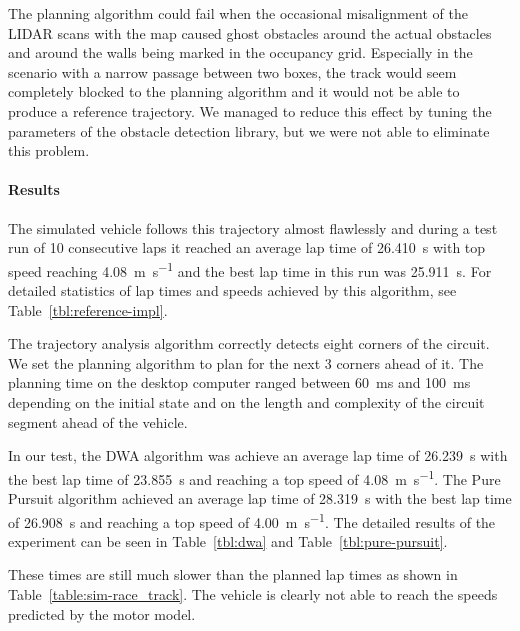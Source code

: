 The planning algorithm could fail when the occasional misalignment of the \gls*{LIDAR} scans with the map caused ghost obstacles around the actual obstacles and around the walls being marked in the occupancy grid. Especially in the scenario with a narrow passage between two boxes, the track would seem completely blocked to the planning algorithm and it would not be able to produce a reference trajectory. We managed to reduce this effect by tuning the parameters of the obstacle detection library, but we were not able to eliminate this problem.

\paragraph{Results}

The simulated vehicle follows this trajectory almost flawlessly and during a test run of 10 consecutive laps it reached an average lap time of \SI{26.410}{\second} with top speed reaching \SI{4.08}{\meter\per\second} and the best lap time in this run was \SI{25.911}{\second}. For detailed statistics of lap times and speeds achieved by this algorithm, see Table~\ref{tbl:reference-impl}.

The trajectory analysis algorithm correctly detects eight corners of the circuit. We set the planning algorithm to plan for the next 3 corners ahead of it. The planning time on the desktop computer ranged between \SI{60}{\milli\second} and \SI{100}{\milli\second} depending on the initial state and on the length and complexity of the circuit segment ahead of the vehicle.

In our test, the \gls*{DWA} algorithm was achieve an average lap time of \SI{26.239}{\s} with the best lap time of \SI{23.855}{\s} and reaching a top speed of \SI{4.08}{\meter\per\second}. The Pure Pursuit algorithm achieved an average lap time of \SI{28.319}{\s} with the best lap time of \SI{26.908}{\s} and reaching a top speed of \SI{4.00}{\meter\per\second}. The detailed results of the experiment can be seen in Table~\ref{tbl:dwa} and Table~\ref{tbl:pure-pursuit}.

These times are still much slower than the planned lap times as shown in Table~\ref{table:sim-race_track}. The vehicle is clearly not able to reach the speeds predicted by the motor model. 

